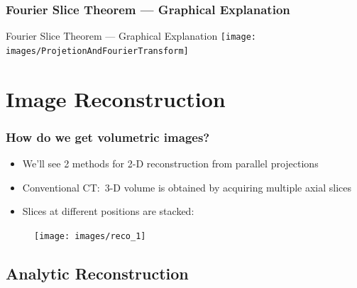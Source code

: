 \begin{frame}
	\frametitle{Fourier Slice Theorem --- Graphical Explanation}
	\centering
	\def\svgwidth{0.55\linewidth}
	

\end{frame}

\begin{frame}[c]{Fourier Slice Theorem --- Graphical Explanation}
	\centering
	\texttt{[image: images/ProjetionAndFourierTransform]}
\end{frame}

\subtitle{Computed Tomography --- Part 2}
\frame[plain,c]{\titlepage}

\section{Image Reconstruction}

\begin{frame}
	\frametitle{How do we get volumetric images?}

	\begin{itemize}
		\item We'll see 2 methods for 2-D reconstruction from parallel projections
		\item Conventional CT:\ 3-D volume is obtained by acquiring multiple axial slices
		\item Slices at different positions are stacked:

	\end{itemize}

	\begin{figure}[tbp]
		\centering
		\texttt{[image: images/reco\_1]}%
		\label{fig:ct_reco_1}
	\end{figure}

\end{frame}

\subsection{Analytic Reconstruction}
\label{sub:ct_analytic}

